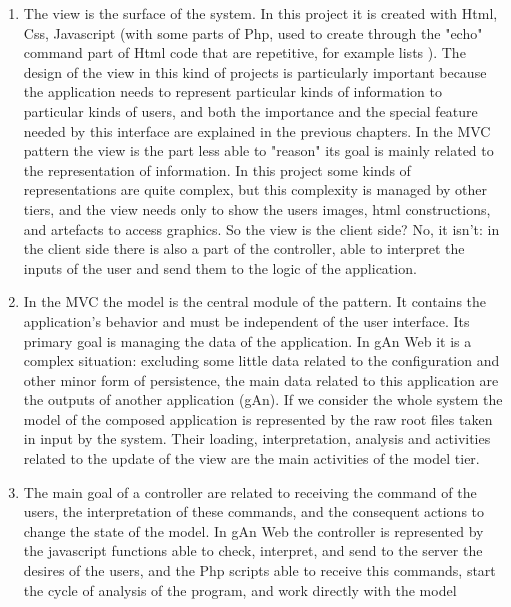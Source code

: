\begin{enumerate}

\item The view is the surface of the system. In this project it is created with Html, Css, Javascript (with some parts of Php, used to create through the "echo" command part of Html code that are repetitive, for example lists ). The design of the view in this kind of projects is particularly important because the application needs to represent particular kinds of information to particular kinds of users, and both the importance and the special feature needed by this interface are explained in the previous chapters. In the MVC pattern the view is the part less able to "reason" its goal is mainly related to the representation of information. In this project some kinds of representations are quite complex, but this complexity is managed by other tiers, and the view needs only to show the users images, html constructions, and artefacts to access graphics. So the view is the client side? No, it isn't: in the client side there is also a part of the controller, able to interpret the inputs of the user and send them to the logic of the application.

\item In the MVC the model is the central module of the pattern. It contains the application's behavior and must be independent of the user interface. Its primary goal is managing the data of the application. In gAn Web it is a complex situation: excluding some little data related to the configuration and other minor form of persistence, the main data related to this application are the outputs of another application (gAn). If we consider the whole system the model of the composed application is represented by the raw root files taken in input by the system. Their loading, interpretation, analysis and activities related to the update of the view are the main activities of the model tier.   

\item The main goal of a controller are related to receiving the command of the users, the interpretation of these commands, and the consequent actions to change the state of the model. In gAn Web the controller is represented by the javascript functions able to check, interpret, and send to the server the desires of the users, and the Php scripts able to receive this commands, start the cycle of analysis of the program, and work directly with the model 


\end{enumerate}

